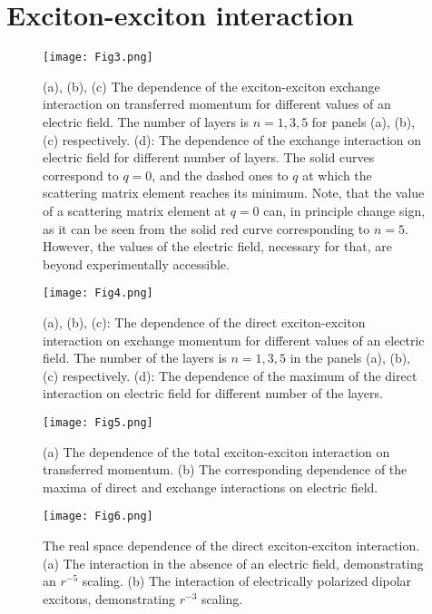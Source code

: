 \documentclass[prb,twocolumn,preprintnumbers,superscriptaddress]{revtex4}
\begin{document}

\section{Exciton-exciton interaction}\label{sec:XXint}

%
\begin{figure}
    \texttt{[image: Fig3.png]}
    \caption{(a), (b), (c) The dependence of the exciton-exciton exchange interaction on transferred momentum for different values of an electric field.  The number of layers is $n=1,3,5$ for panels (a), (b), (c) respectively. 
    (d): The dependence of the exchange interaction on electric field for different number of layers. 
    The solid curves correspond to $q=0$, and the dashed ones to $q$ at which the scattering matrix element reaches its minimum. Note, that the value of a scattering matrix element at $q=0$ can, in principle change sign, as it can be seen from the solid red curve corresponding to $n=5$. However, the values of the electric field, necessary for that, are beyond experimentally accessible.
    }
    \label{fig:XXexch}
\end{figure}
%
%
\begin{figure}
    \texttt{[image: Fig4.png]}
    \caption{(a), (b), (c): The dependence of the direct exciton-exciton interaction on exchange momentum for different values of an electric field.  The number of the layers is $n=1,3,5$ in the panels (a), (b), (c) respectively.  
    (d): The dependence of the maximum of the direct interaction on electric field for different number of the layers. 
    }
    \label{fig:XXdir}
\end{figure}
%
%
\begin{figure}
    \texttt{[image: Fig5.png]}
    \caption{ (a) The  dependence of the total exciton-exciton interaction on transferred momentum. (b) The corresponding dependence  of the maxima of direct and exchange interactions on electric field.
    }
    \label{fig:XXtot}
\end{figure}
%
%
 \begin{figure}
     \texttt{[image: Fig6.png]}
     \caption{ The real space dependence of the direct exciton-exciton interaction. (a) The interaction in the absence of an electric field, demonstrating an $r^{-5}$ scaling. (b) The interaction of electrically polarized dipolar excitons, demonstrating $r^{-3}$ scaling. 
     }
     \label{fig:Vr}
 \end{figure}
%
\end{document}
